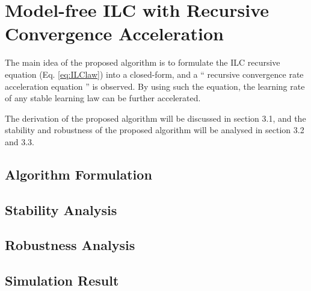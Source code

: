 \chapter{Model-free ILC with Recursive Convergence Acceleration}
\label{ch: Model-free ILC with Recursive Convergence Acceleration}

The main idea of the proposed algorithm is to formulate the ILC recursive equation (Eq. \ref{eq:ILClaw}) into a closed-form, and a “ recursive convergence rate acceleration equation ” is observed. By using such the equation, the learning rate of any stable learning law can be further accelerated. 


The derivation of the proposed algorithm will be discussed in section 3.1, and the stability and robustness of the proposed algorithm will be analysed in section 3.2 and 3.3. 



\section{Algorithm Formulation}
\label{sec: Repetitive Control and ILC}





\section{Stability Analysis}
\label{sec: Stability Analysis}


\section{Robustness Analysis}
\label{sec: Robustness Analysis}

\section{Simulation Result}
\label{sec: Simulation Result}